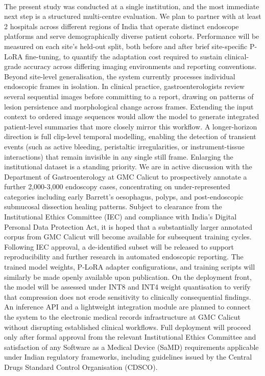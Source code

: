 ﻿﻿\documentclass[12pt]{report}
\begin{document}
The present study was conducted at a single institution, and the most immediate next step is a structured multi-centre evaluation. We plan to partner with at least 2 hospitals across different regions of India that operate distinct endoscope platforms and serve demographically diverse patient cohorts. Performance will be measured on each site's held-out split, both before and after brief site-specific P-LoRA fine-tuning, to quantify the adaptation cost required to sustain clinical-grade accuracy across differing imaging environments and reporting conventions. Beyond site-level generalisation, the system currently processes individual endoscopic frames in isolation. In clinical practice, gastroenterologists review several sequential images before committing to a report, drawing on patterns of lesion persistence and morphological change across frames. Extending the input context to ordered image sequences would allow the model to generate integrated patient-level summaries that more closely mirror this workflow. A longer-horizon direction is full clip-level temporal modelling, enabling the detection of transient events (such as active bleeding, peristaltic irregularities, or instrument-tissue interactions) that remain invisible in any single still frame.
Enlarging the institutional dataset is a standing priority. We are in active discussion with the Department of Gastroenterology at GMC Calicut to prospectively annotate a further 2,000-3,000 endoscopy cases, concentrating on under-represented categories including early Barrett's oesophagus, polyps, and post-endoscopic submucosal dissection healing patterns. Subject to clearance from the Institutional Ethics Committee (IEC) and compliance with India's Digital Personal Data Protection Act, it is hoped that a substantially larger annotated corpus from GMC Calicut will become available for subsequent training cycles. Following IEC approval, a de-identified subset will be released to support reproducibility and further research in automated endoscopic reporting. The trained model weights, P-LoRA adapter configurations, and training scripts will similarly be made openly available upon publication.
On the deployment front, the model will be assessed under INT8 and INT4 weight quantisation to verify that compression does not erode sensitivity to clinically consequential findings. An inference API and a lightweight integration module are planned to connect the system to the electronic medical records infrastructure at GMC Calicut without disrupting established clinical workflows. Full deployment will proceed only after formal approval from the relevant Institutional Ethics Committee and satisfaction of any Software as a Medical Device (SaMD) requirements applicable under Indian regulatory frameworks, including guidelines issued by the Central Drugs Standard Control Organisation (CDSCO).
\end{document}
